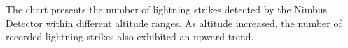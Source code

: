 \documentclass[portuguese]{cenarticle}
\begin{document}
The chart presents the number of lightning strikes detected by the Nimbus Detector within different altitude ranges. As altitude increased, the number of recorded lightning strikes also exhibited an upward trend.




  
  {\setlength{\parindent}{0pt}
    
  }
\end{document}

